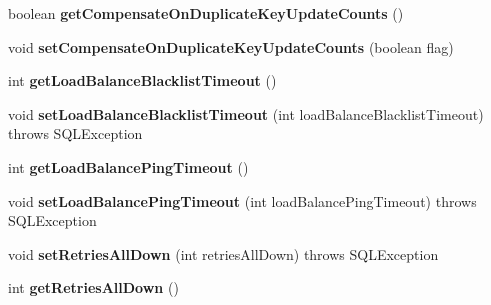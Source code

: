 \begin{DoxyCompactItemize}
boolean {\bfseries get\+Compensate\+On\+Duplicate\+Key\+Update\+Counts} ()
\item 
\mbox{\label{classcom_1_1mysql_1_1jdbc_1_1_connection_properties_impl_a134620a86be7774ac558120b96d90b41}} 
void {\bfseries set\+Compensate\+On\+Duplicate\+Key\+Update\+Counts} (boolean flag)
\item 
\mbox{\label{classcom_1_1mysql_1_1jdbc_1_1_connection_properties_impl_afd076f67dfb15a22988a247ad12844df}} 
int {\bfseries get\+Load\+Balance\+Blacklist\+Timeout} ()
\item 
\mbox{\label{classcom_1_1mysql_1_1jdbc_1_1_connection_properties_impl_adb1535691434749d36c6d20f52ae9204}} 
void {\bfseries set\+Load\+Balance\+Blacklist\+Timeout} (int load\+Balance\+Blacklist\+Timeout)  throws S\+Q\+L\+Exception 
\item 
\mbox{\label{classcom_1_1mysql_1_1jdbc_1_1_connection_properties_impl_ad2277164e28c41b24133c5c5756eff44}} 
int {\bfseries get\+Load\+Balance\+Ping\+Timeout} ()
\item 
\mbox{\label{classcom_1_1mysql_1_1jdbc_1_1_connection_properties_impl_afe3b3e5fb2c5ab410294e4d62067eaca}} 
void {\bfseries set\+Load\+Balance\+Ping\+Timeout} (int load\+Balance\+Ping\+Timeout)  throws S\+Q\+L\+Exception 
\item 
\mbox{\label{classcom_1_1mysql_1_1jdbc_1_1_connection_properties_impl_a2740d1619f41bc03821193b1de37f9d6}} 
void {\bfseries set\+Retries\+All\+Down} (int retries\+All\+Down)  throws S\+Q\+L\+Exception 
\item 
\mbox{\label{classcom_1_1mysql_1_1jdbc_1_1_connection_properties_impl_afabc0602b3c2251794df278b44866372}} 
int {\bfseries get\+Retries\+All\+Down} ()
\item 
\mbox{\label{classcom_1_1mysql_1_1jdbc_1_1_connection_properties_impl_a983e735f630c765f6ee3a4a0b6391f19}} 

\end{DoxyCompactItemize}
